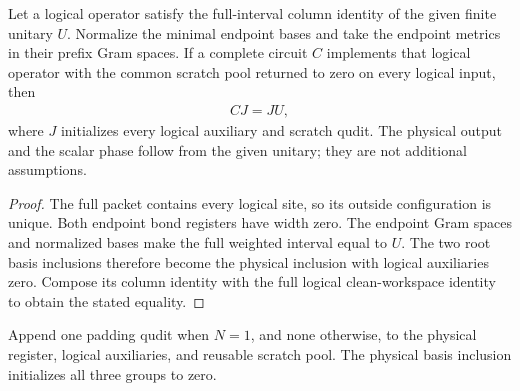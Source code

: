 \begin{lemma}
    \label{thm:mpu_actual_root_columns}
    \leanok
    Let a logical operator satisfy the full-interval column
    identity of the given finite unitary $U$. Normalize the minimal
    endpoint bases and take the endpoint metrics in their
    prefix Gram spaces. If a complete circuit $C$ implements that
    logical operator with the common scratch pool returned to zero
    on every logical input, then
    \begin{align}
        CJ=JU,
    \end{align}
    where $J$ initializes every logical auxiliary and scratch qudit.
    The physical output and the scalar phase follow from the given
    unitary; they are not additional assumptions.
\end{lemma}
\begin{proof}\leanok
    The full packet contains every logical site, so its outside
    configuration is unique. Both endpoint bond registers have width
    zero. The endpoint Gram spaces and normalized bases make
    the full weighted interval equal to $U$. The two root basis
    inclusions therefore become the physical inclusion with logical
    auxiliaries zero. Compose its column identity with the full
    logical clean-workspace identity to obtain the stated equality.
\end{proof}

\begin{definition}
    \label{def:mpu_complete_register}
    \leanok
    Append one padding qudit when $N=1$, and none otherwise, to the physical register,
    logical auxiliaries, and reusable scratch pool. The physical basis inclusion
    initializes all three groups to zero.
\end{definition}


